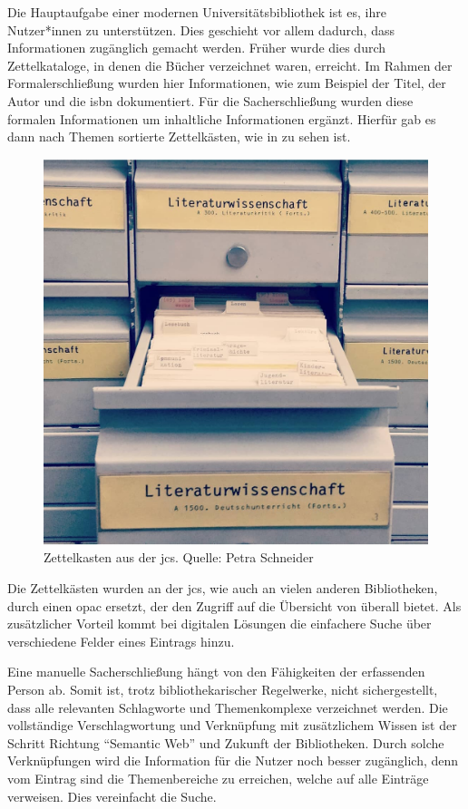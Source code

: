 Die Hauptaufgabe einer modernen Universitätsbibliothek ist es,
ihre Nutzer*innen zu unterstützen.
Dies geschieht vor allem dadurch,
dass Informationen zugänglich gemacht werden.
Früher wurde dies durch Zettelkataloge,
in denen die Bücher verzeichnet waren,
erreicht.
Im Rahmen der Formalerschließung
wurden hier Informationen,
wie zum Beispiel der Titel, der Autor und die \gls{isbn} dokumentiert.
Für die Sacherschließung wurden diese formalen Informationen
um inhaltliche Informationen ergänzt.
Hierfür gab es dann nach Themen sortierte Zettelkästen,
wie in  zu sehen ist.
\begin{figure}
	\includegraphics[keepaspectratio, width=\textwidth]{figures/Zettelkasten.jpg}
	\caption{Zettelkasten aus der \gls{jcs}. Quelle: {Petra Schneider}}
	\label{fig:zettelkasten}
\end{figure}
Die Zettelkästen wurden an der \gls{jcs},
wie auch an vielen anderen Bibliotheken,
durch einen \gls{opac} ersetzt,
der den Zugriff auf die Übersicht von überall bietet.
Als zusätzlicher Vorteil kommt bei digitalen Lösungen
die einfachere Suche über verschiedene Felder eines Eintrags hinzu.

Eine manuelle Sacherschließung hängt von den Fähigkeiten der erfassenden Person ab.
Somit ist,
trotz bibliothekarischer Regelwerke,
nicht sichergestellt,
dass alle relevanten Schlagworte und Themenkomplexe verzeichnet werden.
Die vollständige Verschlagwortung und Verknüpfung mit zusätzlichem Wissen
ist der Schritt Richtung \enquote{Semantic Web}
und Zukunft der Bibliotheken.
Durch solche Verknüpfungen wird die Information für die Nutzer noch besser zugänglich,
denn vom Eintrag sind die Themenbereiche zu erreichen,
welche auf alle Einträge verweisen.
Dies vereinfacht die Suche.

